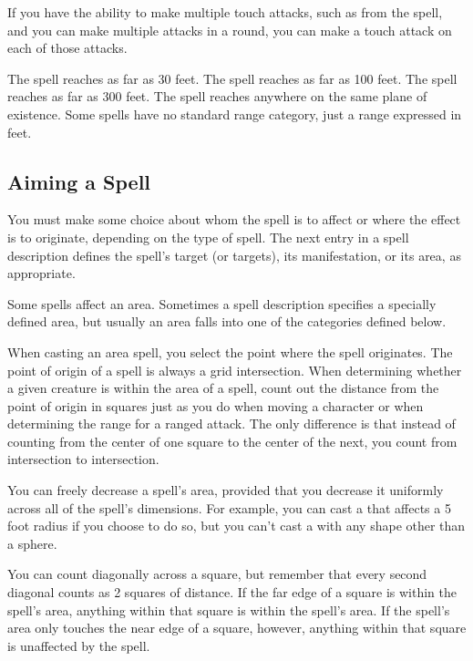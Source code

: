 If you have the ability to make multiple touch attacks, such as from the  spell, and you can make multiple attacks in a round, you can make a touch attack on each of those attacks.

 The spell reaches as far as 30 feet.
 The spell reaches as far as 100 feet.
 The spell reaches as far as 300 feet.
 The spell reaches anywhere on the same plane of existence.
 Some spells have no standard range category, just a range expressed in feet.

\subsection{Aiming a Spell}
You must make some choice about whom the spell is to affect or where the effect is to originate, depending on the type of spell. The next entry in a spell description defines the spell's target (or targets), its manifestation, or its area, as appropriate.

\label{Spell Area} Some spells affect an area. Sometimes a spell description specifies a specially defined area, but usually an area falls into one of the categories defined below.

When casting an area spell, you select the point where the spell originates. The point of origin of a spell is always a grid intersection. When determining whether a given creature is within the area of a spell, count out the distance from the point of origin in squares just as you do when moving a character or when determining the range for a ranged attack. The only difference is that instead of counting from the center of one square to the center of the next, you count from intersection to intersection.

You can freely decrease a spell's area, provided that you decrease it uniformly across all of the spell's dimensions. For example, you can cast a  that affects a 5 foot radius if you choose to do so, but you can't cast a  with any shape other than a sphere.

You can count diagonally across a square, but remember that every second diagonal counts as 2 squares of distance. If the far edge of a square is within the spell's area, anything within that square is within the spell's area. If the spell's area only touches the near edge of a square, however, anything within that square is unaffected by the spell.

